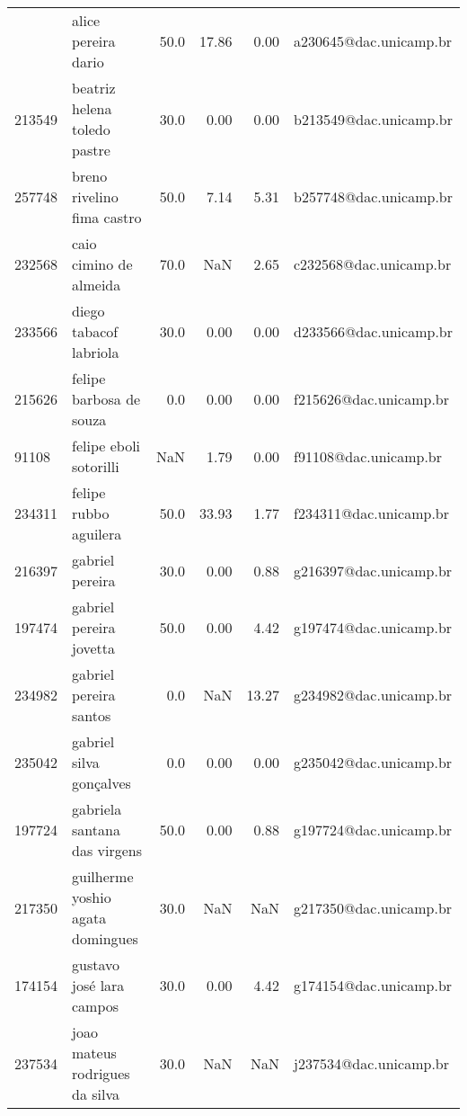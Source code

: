 \documentclass[11pt]{article}
\begin{document}
{\begin{landscape}
\begin{longtable}{llrrrl}
\bottomrule
\endlastfoot
230645 &                    alice pereira dario &                  50.0 &       17.86 &        0.00 &  a230645@dac.unicamp.br \\
213549 &           beatriz helena toledo pastre &                  30.0 &        0.00 &        0.00 &  b213549@dac.unicamp.br \\
257748 &             breno rivelino fima castro &                  50.0 &        7.14 &        5.31 &  b257748@dac.unicamp.br \\
232568 &                 caio cimino de almeida &                  70.0 &         NaN &        2.65 &  c232568@dac.unicamp.br \\
233566 &                 diego tabacof labriola &                  30.0 &        0.00 &        0.00 &  d233566@dac.unicamp.br \\
215626 &                felipe barbosa de souza &                   0.0 &        0.00 &        0.00 &  f215626@dac.unicamp.br \\
91108  &                 felipe eboli sotorilli &                   NaN &        1.79 &        0.00 &   f91108@dac.unicamp.br \\
234311 &                  felipe rubbo aguilera &                  50.0 &       33.93 &        1.77 &  f234311@dac.unicamp.br \\
216397 &                        gabriel pereira &                  30.0 &        0.00 &        0.88 &  g216397@dac.unicamp.br \\
197474 &                gabriel pereira jovetta &                  50.0 &        0.00 &        4.42 &  g197474@dac.unicamp.br \\
234982 &                 gabriel pereira santos &                   0.0 &         NaN &       13.27 &  g234982@dac.unicamp.br \\
235042 &                gabriel silva gonçalves &                   0.0 &        0.00 &        0.00 &  g235042@dac.unicamp.br \\
197724 &           gabriela santana das virgens &                  50.0 &        0.00 &        0.88 &  g197724@dac.unicamp.br \\
217350 &       guilherme yoshio agata domingues &                  30.0 &         NaN &         NaN &  g217350@dac.unicamp.br \\
174154 &               gustavo josé lara campos &                  30.0 &        0.00 &        4.42 &  g174154@dac.unicamp.br \\
237534 &         joao mateus rodrigues da silva &                  30.0 &         NaN &         NaN &  j237534@dac.unicamp.br \\

\end{longtable}
\end{landscape}}
\end{document}

